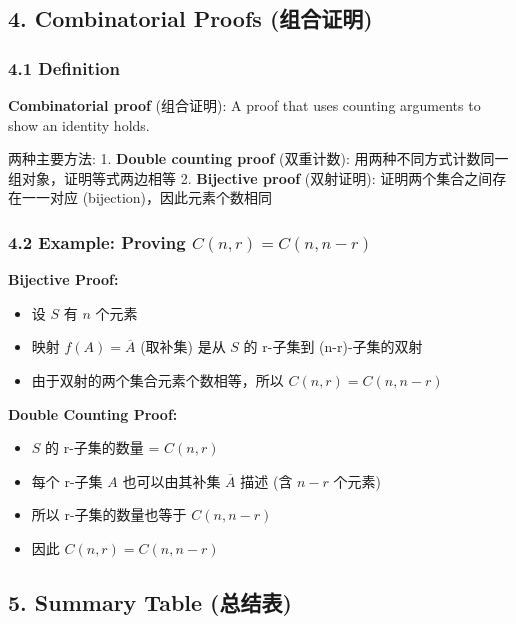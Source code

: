 \documentclass[10pt,a4paper,openany]{ctexbook}
\theoremstyle{definition}
\theoremstyle{remark}
\renewenvironment{quote}
  {\list{}{\leftmargin=1em\rightmargin=0pt\topsep=0.5pt\partopsep=0pt}\item[]}
  {\endlist}
\begin{document}
\subsection{4. Combinatorial Proofs (组合证明)}

\subsubsection{4.1 Definition}

\begin{quote}
\textbf{Combinatorial proof} (组合证明): A proof that uses counting arguments to show an identity holds.

两种主要方法:
1. \textbf{Double counting proof} (双重计数): 用两种不同方式计数同一组对象，证明等式两边相等
2. \textbf{Bijective proof} (双射证明): 证明两个集合之间存在一一对应 (bijection)，因此元素个数相同

\end{quote}

\subsubsection{4.2 Example: Proving $C(n, r) = C(n, n-r)$}

\textbf{Bijective Proof:}
\begin{itemize}
\item 设 $S$ 有 $n$ 个元素
\item 映射 $f(A) = \overline{A}$ (取补集) 是从 $S$ 的 r-子集到 (n-r)-子集的双射
\item 由于双射的两个集合元素个数相等，所以 $C(n, r) = C(n, n-r)$

\end{itemize}

\textbf{Double Counting Proof:}
\begin{itemize}
\item $S$ 的 r-子集的数量 = $C(n, r)$
\item 每个 r-子集 $A$ 也可以由其补集 $\overline{A}$ 描述 (含 $n-r$ 个元素)
\item 所以 r-子集的数量也等于 $C(n, n-r)$
\item 因此 $C(n, r) = C(n, n-r)$

\end{itemize}

\vspace{-2pt}

\subsection{5. Summary Table (总结表)}
\end{document}

